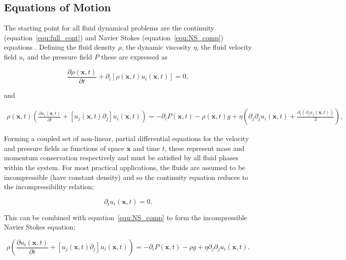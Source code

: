 \documentclass[12pt]{article}
\begin{document}
\subsection{Equations of Motion}
\label{subsec:EoM}

The starting point for all fluid dynamical problems are the continuity (equation~\ref{equ:full_cont}) and Navier Stokes (equation~\ref{equ:NS_comp}) equations \citep{Batchelor67}. Defining the fluid density $\rho$, the dynamic viscosity $\eta$, the fluid velocity field $u_{i}$ and the pressure field $P$ these are expressed as

\begin{equation}
\label{equ:full_cont}
\frac{\partial \rho(\boldsymbol x,t)}{\partial t} + \partial_{i} [\rho(\boldsymbol{x},t) u_{i} (\boldsymbol{x},t)] = 0 ,
\end{equation}  

and 

\begin{align}
\label{equ:NS_comp}
\rho(\boldsymbol{x},t) \left( \frac{\partial u_{i}(\boldsymbol{x},t)}{\partial t} + [u_{j}(\boldsymbol{x},t) \partial_{j}] u_{i}(\boldsymbol{x},t) \right) = - \partial_{i} P(\boldsymbol{x},t) - \rho(\boldsymbol{x},t) g + \eta \left(\partial_{j} \partial_{j} u_{i}(\boldsymbol{x},t) + \frac{\partial_{i} (\partial_{j} u_{j}(\boldsymbol{x},t))}{3} \right) ,
\end{align} 

Forming a coupled set of non-linear, partial differential equations for the velocity and pressure fields as functions of space $\boldsymbol{x}$ and time $t$, these represent mass and momentum conservation respectively and must be satisfied by all fluid phases within the system. For most practical applications, the fluids are assumed to be incompressible (have constant density) and so the continuity equation reduces to the incompressibility relation;

\begin{equation}
\label{equ:incom}
\partial_{i} u_{i}(\boldsymbol{x},t) = 0 .
\end{equation}

This can be combined with equation~\ref{equ:NS_comp} to form the incompressible Navier Stokes equation;

\begin{equation}
\label{equ:NS_incom}
\rho \left( \frac{\partial u_{i}(\boldsymbol{x},t)}{\partial t} + [u_{j}(\boldsymbol{x},t) \partial_{j}] u_{i}(\boldsymbol{x},t) \right) = - \partial_{i} P(\boldsymbol{x},t) - \rho g + \eta \partial_{j} \partial_{j} u_{i}(\boldsymbol{x},t) .
\end{equation} 
\end{document}
